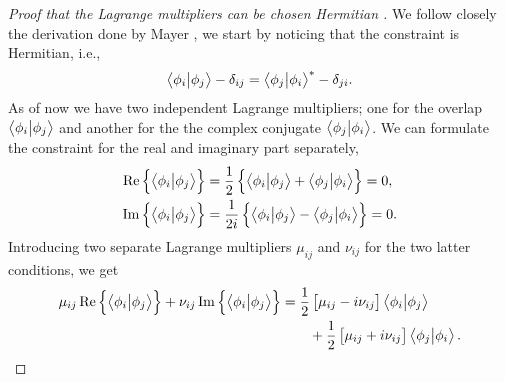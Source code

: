             \begin{proof}[%
                    Proof that the Lagrange multipliers can be chosen Hermitian%
                ]
                We follow closely the derivation done by Mayer
                \cite{mayer2003simple}, we start by noticing that the constraint is
                Hermitian, i.e.,
                \begin{align}
                    \braket{\phi_i}{\phi_j} - \delta_{ij}
                    = \braket{\phi_j}{\phi_i}^{*} - \delta_{ji}.
                \end{align}
                As of now we have two independent Lagrange multipliers; one for the
                overlap $\braket{\phi_i}{\phi_j}$ and another for the the complex
                conjugate $\braket{\phi_j}{\phi_i}$.
                We can formulate the constraint for the real and imaginary part
                separately,
                \begin{align}
                    \Re\left\{ 
                        \braket{\phi_i}{\phi_j}
                     \right\}
                    &=
                    \frac{1}{2}\left\{ 
                        \braket{\phi_i}{\phi_j}
                        + \braket{\phi_j}{\phi_i}
                     \right\}
                    = 0,
                    \\
                    \Im\left\{ 
                        \braket{\phi_i}{\phi_j}
                     \right\}
                    &=
                    \frac{1}{2i}\left\{ 
                        \braket{\phi_i}{\phi_j}
                        - \braket{\phi_j}{\phi_i}
                     \right\}
                    = 0.
                \end{align}
                Introducing two separate Lagrange multipliers $\mu_{ij}$ and
                $\nu_{ij}$ for the two latter conditions, we get
                \begin{align}
                    \mu_{ij}\Re\brac{
                        \braket{\phi_i}{\phi_j}
                    }
                    + \nu_{ij}\Im\brac{
                        \braket{\phi_i}{\phi_j}
                    }
                    &=
                    \half\brak{
                        \mu_{ij} - i\nu_{ij}
                    }
                    \braket{\phi_i}{\phi_j}
                    \nonumber
                    \\
                    &\qquad
                    + \half\brak{
                        \mu_{ij} + i\nu_{ij}
                    }
                    \braket{\phi_j}{\phi_i}.

\end{align}
\end{proof}

